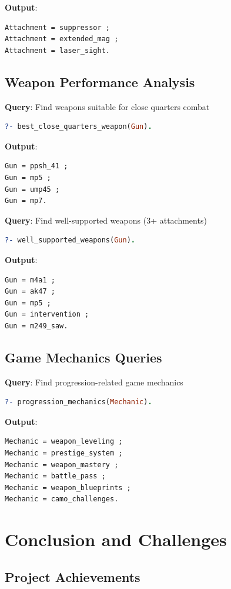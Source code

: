 \documentclass[12pt,a4paper]{article}
\begin{document}
\textbf{Output}:
\begin{lstlisting}
Attachment = suppressor ;
Attachment = extended_mag ;
Attachment = laser_sight.
\end{lstlisting}

\subsection{Weapon Performance Analysis}

\textbf{Query}: Find weapons suitable for close quarters combat
\begin{lstlisting}[language=Prolog]
?- best_close_quarters_weapon(Gun).
\end{lstlisting}

\textbf{Output}:
\begin{lstlisting}
Gun = ppsh_41 ;
Gun = mp5 ;
Gun = ump45 ;
Gun = mp7.
\end{lstlisting}

\textbf{Query}: Find well-supported weapons (3+ attachments)
\begin{lstlisting}[language=Prolog]
?- well_supported_weapons(Gun).
\end{lstlisting}

\textbf{Output}:
\begin{lstlisting}
Gun = m4a1 ;
Gun = ak47 ;
Gun = mp5 ;
Gun = intervention ;
Gun = m249_saw.
\end{lstlisting}

\subsection{Game Mechanics Queries}

\textbf{Query}: Find progression-related game mechanics
\begin{lstlisting}[language=Prolog]
?- progression_mechanics(Mechanic).
\end{lstlisting}

\textbf{Output}:
\begin{lstlisting}
Mechanic = weapon_leveling ;
Mechanic = prestige_system ;
Mechanic = weapon_mastery ;
Mechanic = battle_pass ;
Mechanic = weapon_blueprints ;
Mechanic = camo_challenges.
\end{lstlisting}

\section{Conclusion and Challenges}

\subsection{Project Achievements}
\end{document}
